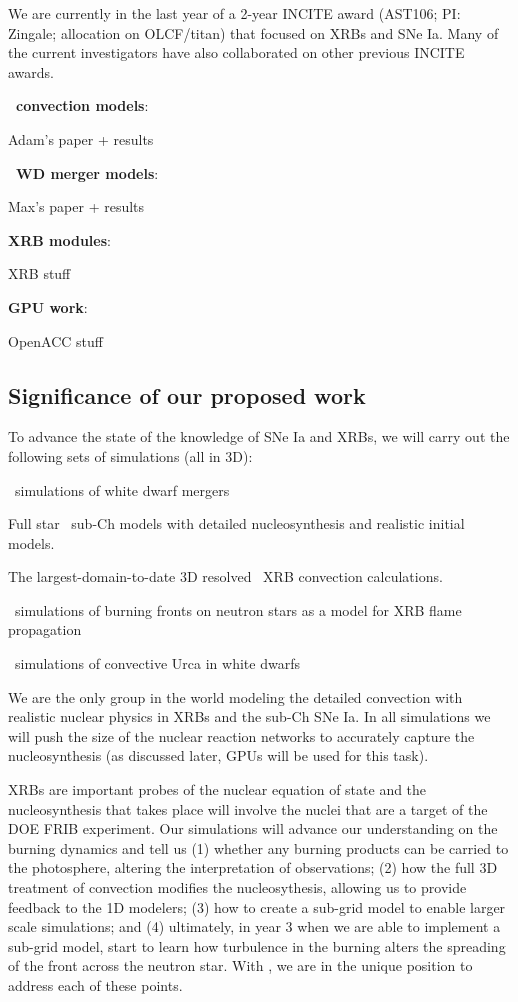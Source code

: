 \documentclass[11pt,letterpaper,english]{article}
\begin{document}
We are currently in the last year of a 2-year INCITE award (AST106;
PI: Zingale; allocation on OLCF/titan) that focused on XRBs and SNe
Ia.  Many of the current investigators have also collaborated on other
previous INCITE awards.  

{\bf \maestro\ convection models}:
%

Adam's paper + results

{\bf \castro\ WD merger models}:
%

Max's paper + results



{\bf \maestro XRB modules}:

XRB stuff



{\bf GPU work}:

OpenACC stuff




\subsection{Significance of our proposed work}

To advance the state of the knowledge of SNe Ia and XRBs, we will
carry out the following sets of simulations (all in 3D):
\begin{tightitem}
\item \castro\ simulations of white dwarf mergers
\item Full star \maestro\ sub-Ch models with 
  detailed nucleosynthesis and realistic initial models.
\item The largest-domain-to-date 3D resolved \maestro\ XRB convection
  calculations.
\item \castro\ simulations of burning fronts on neutron stars
  as a model for XRB flame propagation
\item \maestro\ simulations of convective Urca in white dwarfs
\end{tightitem}

We are the only group in the world modeling the detailed convection
with realistic nuclear physics in XRBs and the sub-Ch SNe Ia.
In all simulations we will push the size of the nuclear reaction networks
to accurately capture the nucleosynthesis (as discussed later, GPUs will
be used for this task).

XRBs are important probes of the nuclear equation of 
state and the nucleosynthesis that
takes place will involve the nuclei that are a target of the DOE FRIB
experiment.  Our simulations will advance our understanding on the
burning dynamics and tell us (1) whether any burning products can be
carried to the photosphere, altering the interpretation of
observations; (2) how the full 3D treatment of convection modifies the
nucleosythesis, allowing us to provide feedback to the 1D modelers;
(3) how to create a sub-grid model to enable larger scale simulations;
and (4) ultimately, in year 3 when we are able to implement a sub-grid
model, start to learn how turbulence in the burning alters the
spreading of the front across the neutron star.  With \maestro, we are
in the unique position to address each of these points.
\end{document}
